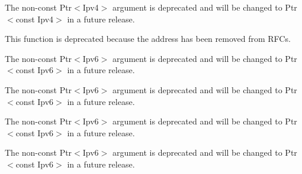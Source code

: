 \begin{DoxyRefList}
\item[\label{deprecated__deprecated000006}%
\hypertarget{deprecated__deprecated000006}{}%
Member \hyperlink{classns3_1_1Ipv4L3Protocol_a7da7189506cc53d778ccc2b6cba88e2d}{ns3\+:\+:Ipv4\+L3\+Protocol\+:\+:Tx\+Rx\+Traced\+Callback} )(Ptr$<$ const Packet $>$ packet, Ptr$<$ Ipv4 $>$ ipv4, uint32\+\_\+t interface)]The non-\/const {\ttfamily Ptr$<$\+Ipv4$>$} argument is deprecated and will be changed to {\ttfamily Ptr$<$const Ipv4$>$} in a future release.  
\item[\label{deprecated__deprecated000023}%
\hypertarget{deprecated__deprecated000023}{}%
Member \hyperlink{classns3_1_1Ipv6Address_a7762ba1ce598965edcab89d548589b38}{ns3\+:\+:Ipv6\+Address\+:\+:Is\+All\+Hosts\+Multicast} () const ]This function is deprecated because the address has been removed from R\+F\+Cs. 
\item[\label{deprecated__deprecated000012}%
\hypertarget{deprecated__deprecated000012}{}%
Member \hyperlink{classns3_1_1Ipv6L3Protocol_a9b04d0fb9a344dce07430ba7d90f0995}{ns3\+:\+:Ipv6\+L3\+Protocol\+:\+:Drop\+Traced\+Callback} )(const \hyperlink{classns3_1_1Ipv6Header}{Ipv6\+Header} \&header, Ptr$<$ const Packet $>$ packet, Drop\+Reason reason, Ptr$<$ Ipv6 $>$ ipv6, uint32\+\_\+t interface)]The non-\/const {\ttfamily Ptr$<$\+Ipv6$>$} argument is deprecated and will be changed to {\ttfamily Ptr$<$const Ipv6$>$} in a future release.  
\item[\label{deprecated__deprecated000015}%
\hypertarget{deprecated__deprecated000015}{}%
Member \hyperlink{classns3_1_1Ipv6L3Protocol_ac22d2d63cac436267ae6cafc46880a6e}{ns3\+:\+:Ipv6\+L3\+Protocol\+:\+:m\+\_\+drop\+Trace} ]The non-\/const {\ttfamily Ptr$<$\+Ipv6$>$} argument is deprecated and will be changed to {\ttfamily Ptr$<$const Ipv6$>$} in a future release.  
\item[\label{deprecated__deprecated000014}%
\hypertarget{deprecated__deprecated000014}{}%
Member \hyperlink{classns3_1_1Ipv6L3Protocol_a2fc8b57fc958fccd7c708f8c8ca03da5}{ns3\+:\+:Ipv6\+L3\+Protocol\+:\+:m\+\_\+rx\+Trace} ]The non-\/const {\ttfamily Ptr$<$\+Ipv6$>$} argument is deprecated and will be changed to {\ttfamily Ptr$<$const Ipv6$>$} in a future release.  
\item[\label{deprecated__deprecated000013}%
\hypertarget{deprecated__deprecated000013}{}%
Member \hyperlink{classns3_1_1Ipv6L3Protocol_a2037be8528273f3495216a09384e38e7}{ns3\+:\+:Ipv6\+L3\+Protocol\+:\+:m\+\_\+tx\+Trace} ]The non-\/const {\ttfamily Ptr$<$\+Ipv6$>$} argument is deprecated and will be changed to {\ttfamily Ptr$<$const Ipv6$>$} in a future release.  

\end{DoxyRefList}
